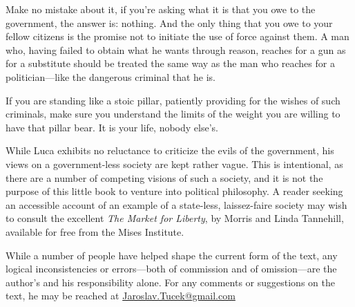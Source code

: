Make no mistake about it, if you're asking what it is that you owe to the government, the answer is: nothing. And the only thing that you owe to your fellow citizens is the promise not to initiate the use of force against them. A man who, having failed to obtain what he wants through reason, reaches for a gun as for a substitute should be treated the same way as the man who reaches for a politician---like the dangerous criminal that he is.

If you are standing like a stoic pillar, patiently providing for the wishes of such criminals, make sure you understand the limits of the weight you are willing to have that pillar bear. It is your life, nobody else's.

\sectionline

While Luca exhibits no reluctance to criticize the evils of the government, his views on a government-less society are kept rather vague. This is intentional, as there are a number of competing visions of such a society, and it is not the purpose of this little book to venture into political philosophy. A reader seeking an accessible account of an example of a state-less, laissez-faire society may wish to consult the excellent \emph{The Market for Liberty}, by Morris and Linda Tannehill, available for free from the Mises Institute.

\sectionline

While a number of people have helped shape the current form of the text, any logical inconsistencies or errors---both of commission and of omission---are the author's and his responsibility alone. For any comments or suggestions on the text, he may be reached at \href{mailto:Jaroslav.Tucek@gmail.com}{Jaroslav.Tucek@gmail.com}


